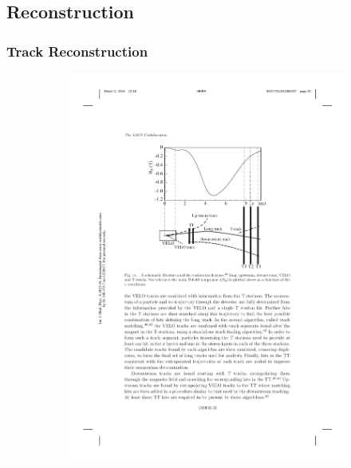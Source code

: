 \subsubsection{\hlttwo}

\subsection{Reconstruction}
\subsubsection{Track Reconstruction}


\begin{figure}[!h]
    \centering
    \begin{subfigure}[t]{0.4\textwidth}
        \centering
        \includegraphics[width=1.0\textwidth]{figs/Detector/reco_track_types.pdf}

\end{subfigure}
\end{figure}
